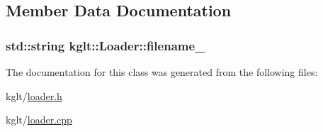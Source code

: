 \subsection{Member Data Documentation}
\hypertarget{classkglt_1_1_loader_ac6d7cf644388ad9ba8c63941274eee26}{
\subsubsection[{filename\-\_\-}]{\setlength{\rightskip}{0pt plus 5cm}std\-::string kglt\-::\-Loader\-::filename\-\_\-\hspace{0.3cm}{\ttfamily [protected]}}}\label{classkglt_1_1_loader_ac6d7cf644388ad9ba8c63941274eee26}


The documentation for this class was generated from the following files\-:\begin{DoxyCompactItemize}
\item 
kglt/\hyperlink{loader_8h}{loader.\-h}\item 
kglt/\hyperlink{loader_8cpp}{loader.\-cpp}\end{DoxyCompactItemize}
